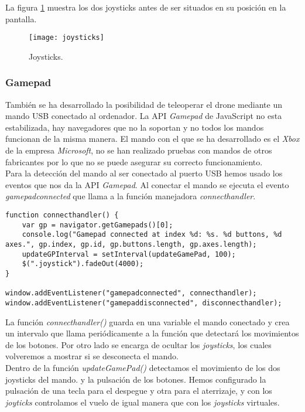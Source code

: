 La figura \ref{fig:joysticks} muestra los dos joysticks antes de ser situados en su posición en la pantalla.\\

\begin{figure}[h!]
\centering
\texttt{[image: joysticks]}
\caption{Joysticks.}
\label{fig:joysticks}
\end{figure}


\subsubsection{Gamepad}

También se ha desarrollado la posibilidad de teleoperar el drone mediante un mando USB conectado al ordenador. La API \emph{Gamepad} de JavaScript no esta estabilizada, hay navegadores que no la soportan y no todos los mandos funcionan de la misma manera. El mando con el que se ha desarrollado es el \emph{Xbox} de la empresa \emph{Microsoft}, no se han realizado pruebas con mandos de otros fabricantes por lo que no se puede asegurar su correcto funcionamiento. \\

Para la detección del mando al ser conectado al puerto USB hemos usado los eventos que nos da la API \emph{Gamepad}. Al conectar el mando se ejecuta el evento \emph{gamepadconnected} que llama a la función manejadora \emph{connecthandler}.\\

\begin{lstlisting}[caption=Detección del mando.]
function connecthandler() {
    var gp = navigator.getGamepads()[0];
    console.log("Gamepad connected at index %d: %s. %d buttons, %d axes.", gp.index, gp.id, gp.buttons.length, gp.axes.length);
    updateGPInterval = setInterval(updateGamePad, 100);
    $(".joystick").fadeOut(4000);
}

window.addEventListener("gamepadconnected", connecthandler);
window.addEventListener("gamepaddisconnected", disconnecthandler);
\end{lstlisting}

La función \emph{connecthandler()} guarda en una variable el mando conectado y crea un intervalo que llama periódicamente a la función que detectará los movimientos de los botones. Por otro lado se encarga de ocultar los \emph{joysticks}, los cuales volveremos a mostrar si se desconecta el mando.\\

Dentro de la función \emph{updateGamePad()} detectamos el movimiento de los dos joysticks del mando. y la pulsación de los botones. Hemos configurado la pulsación de una tecla para el despegue y otra para el aterrizaje, y con los \emph{joyticks} controlamos el vuelo de igual manera que con los \emph{joysticks} virtuales.

